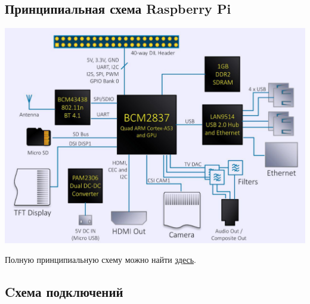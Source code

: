 \documentclass[a4paper,12pt]{article}
\begin{document}
\subsection{Принципиальная схема Raspberry Pi}
\begin{center}
  \includegraphics[width=\textwidth]{raspSchema.pdf}
\end{center}
Полную принципиальную схему можно найти \href{https://datasheets.raspberrypi.com/rpi2/raspberry-pi-2-b-reduced-schematics.pdf}{здесь}.

\subsection{Cхема подключений}
\end{document}
